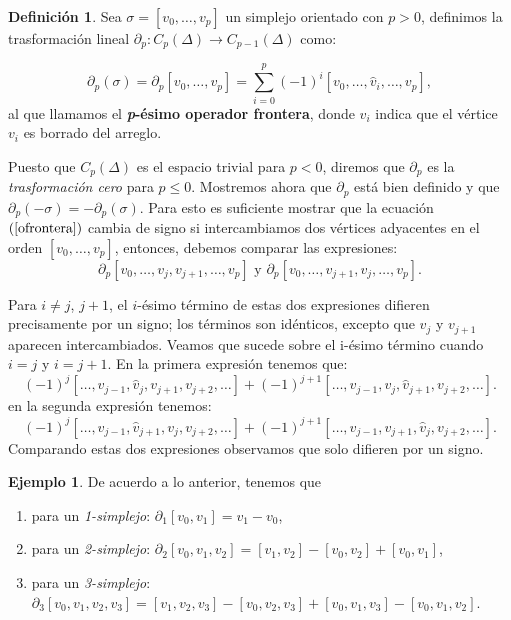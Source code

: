 \documentclass[12pt]{book}
\theoremstyle{definition}
\newtheorem{definition}[theorem]{Definición}
\newtheorem{example}[theorem]{Ejemplo}
\newcounter{in}
\newcounter{ini}
\begin{document}
{\begin{definition}
  Sea $\sigma=[v_{0},\ldots,v_{p}]$ un simplejo orientado con $p>0$,
  definimos la trasformación lineal $\partial_{p}:C_{p}(\Delta)\rightarrow
  C_{p-1}(\Delta)$ como:

  \begin{equation}
    \label{ofrontera}
    \partial_{p}(\sigma)=\partial_{p}[v_{0},\ldots,v_{p}]=\sum^{p}_{i=0}(-1)^{i}[v_{0},\ldots,\widehat
    v_{i},\ldots,v_{p}],
  \end{equation}
  al que llamamos el \textbf{\emph{p}-ésimo operador frontera}, donde
  $\widehat v_{i}$ indica que el vértice $v_{i}$ es borrado del arreglo.
\end{definition}

Puesto que $C_{p}(\Delta)$ es el espacio trivial para $p<0$, diremos
que $\partial_{p}$ es la \textit{trasformación cero} para $p\leq
0$. Mostremos ahora que $\partial_{p}$ está bien definido y que
$\partial_{p}(-\sigma)=-\partial_{p}(\sigma)$. Para esto es suficiente
mostrar que la ecuación $(\ref{ofrontera})$ cambia de signo si intercambiamos dos
vértices adyacentes en el orden $[v_{0},\ldots,v_{p}]$, entonces,
debemos comparar las expresiones:
$$\partial_{p}[v_{0},\ldots,v_{j},v_{j+1},\ldots,v_{p}] \mbox{ y } \partial_{p}[v_{0},\ldots,v_{j+1},v_{j},\ldots,v_{p}].$$

Para $i\neq j$, $j+1$, el $i$-ésimo término de estas dos expresiones
difieren precisamente por un signo; los términos son idénticos,
excepto que $v_{j}$ y $v_{j+1}$ aparecen intercambiados. Veamos que
sucede sobre el i-ésimo término cuando $i=j$ y $i=j+1$. En la primera
expresión tenemos que:
$$(-1)^{j}[\ldots,v_{j-1},\widehat v_{j},v_{j+1},v_{j+2},\ldots]+(-1)^{j+1}[\ldots,v_{j-1},v_{j},\widehat
v_{j+1},v_{j+2},\ldots].$$
en la segunda expresión tenemos:
$$(-1)^{j}[\ldots,v_{j-1},\widehat v_{j+1},v_{j},v_{j+2},\ldots]+(-1)^{j+1}[\ldots,v_{j-1},v_{j+1},\widehat
v_{j},v_{j+2},\ldots].$$
Comparando estas dos expresiones observamos que solo difieren por un signo.

\begin{example}
  De acuerdo a lo anterior, tenemos que
  \begin{enumerate}
  \item para un \emph{1-simplejo}: $\partial_{1}[v_{0},v_{1}]= v_{1}-v_{0}$,
  \item para un \emph{2-simplejo}: $\partial_{2}[v_{0},v_{1},v_{2}]=[v_{1},v_{2}]-[v_{0},v_{2}]+[v_{0},v_{1}]$,
  \item para un \emph{3-simplejo}:
    $\partial_{3}[v_{0},v_{1},v_{2},v_{3}]=[v_{1},v_{2},v_{3}]-[v_{0},v_{2},v_{3}]+[v_{0},v_{1},v_{3}]-[v_{0},v_{1},v_{2}]$. 
  \end{enumerate}
\end{example}

}
\end{document}
